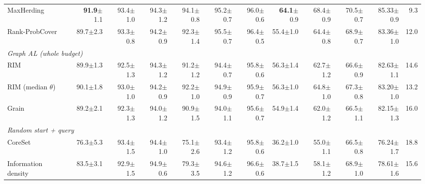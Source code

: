 \begin{table}[t]
\begin{adjustbox}{max width=\textwidth}
\begin{tabular}{lrrrrrrrrrrr}
\quad MaxHerding~\cite{bae2024generalized} & \textbf{91.9}{\scriptsize$\pm$1.1} & 93.4{\scriptsize$\pm$1.0} & 94.3{\scriptsize$\pm$1.2} & 94.1{\scriptsize$\pm$0.8} & 95.2{\scriptsize$\pm$0.7} & 96.0{\scriptsize$\pm$0.6} & \textbf{64.1}{\scriptsize$\pm$0.9} & 68.4{\scriptsize$\pm$0.9} & 70.5{\scriptsize$\pm$0.7} & 85.33{\scriptsize$\pm$0.9} & 9.3 \\
\quad Rank-ProbCover & 89.7{\scriptsize$\pm$2.3} & 93.3{\scriptsize$\pm$0.8} & 94.2{\scriptsize$\pm$0.9} & 92.3{\scriptsize$\pm$1.4} & 95.5{\scriptsize$\pm$0.7} & 96.4{\scriptsize$\pm$0.5} & 55.4{\scriptsize$\pm$1.0} & 64.4{\scriptsize$\pm$0.8} & 68.9{\scriptsize$\pm$0.7} & 83.36{\scriptsize$\pm$1.0} & 12.0 \\
\multicolumn{12}{l}{\textit{Graph AL (whole budget)}} \\
\quad RIM~\cite{zhang2021rim} & 89.9{\scriptsize$\pm$1.3} & 92.5{\scriptsize$\pm$1.3} & 94.3{\scriptsize$\pm$1.2} & 91.2{\scriptsize$\pm$1.2} & 94.4{\scriptsize$\pm$0.7} & 95.8{\scriptsize$\pm$0.6} & 56.3{\scriptsize$\pm$1.4} & 62.7{\scriptsize$\pm$1.2} & 66.6{\scriptsize$\pm$0.9} & 82.63{\scriptsize$\pm$1.1} & 14.6 \\
\quad RIM (median $\theta$)~\cite{zhang2021rim} & 90.1{\scriptsize$\pm$1.8} & 93.0{\scriptsize$\pm$1.0} & 94.2{\scriptsize$\pm$0.9} & 92.2{\scriptsize$\pm$1.0} & 94.9{\scriptsize$\pm$0.9} & 95.9{\scriptsize$\pm$0.7} & 56.3{\scriptsize$\pm$1.0} & 64.8{\scriptsize$\pm$1.0} & 67.3{\scriptsize$\pm$0.8} & 83.20{\scriptsize$\pm$1.0} & 13.2 \\
\quad Grain~\cite{zhang2021grain} & 89.2{\scriptsize$\pm$2.1} & 92.3{\scriptsize$\pm$1.3} & 94.0{\scriptsize$\pm$1.2} & 90.9{\scriptsize$\pm$1.5} & 94.0{\scriptsize$\pm$1.1} & 95.6{\scriptsize$\pm$0.7} & 54.9{\scriptsize$\pm$1.4} & 62.0{\scriptsize$\pm$1.2} & 66.5{\scriptsize$\pm$1.1} & 82.15{\scriptsize$\pm$1.3} & 16.0 \\
\multicolumn{12}{l}{\textit{Random start + query}} \\
\quad CoreSet~\cite{sener2017active} & 76.3{\scriptsize$\pm$5.3} & 93.4{\scriptsize$\pm$1.5} & 94.4{\scriptsize$\pm$1.0} & 75.1{\scriptsize$\pm$2.6} & 93.4{\scriptsize$\pm$1.2} & 95.8{\scriptsize$\pm$0.6} & 36.2{\scriptsize$\pm$1.0} & 55.0{\scriptsize$\pm$1.1} & 66.5{\scriptsize$\pm$0.8} & 76.24{\scriptsize$\pm$1.7} & 18.8 \\
\quad Information density~\cite{settles2008analysis} & 83.5{\scriptsize$\pm$3.1} & 92.9{\scriptsize$\pm$1.5} & 94.9{\scriptsize$\pm$0.6} & 79.3{\scriptsize$\pm$3.5} & 94.6{\scriptsize$\pm$1.2} & 96.6{\scriptsize$\pm$0.6} & 38.7{\scriptsize$\pm$1.5} & 58.1{\scriptsize$\pm$1.2} & 68.9{\scriptsize$\pm$1.0} & 78.61{\scriptsize$\pm$1.6} & 15.6 \\

\end{tabular}
\end{adjustbox}
\end{table}
